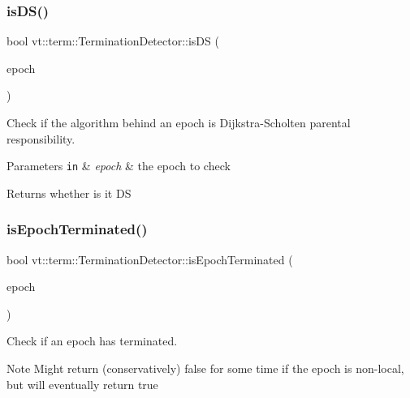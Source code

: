\subsubsection{\texorpdfstring{is\+D\+S()}{isDS()}}
{\footnotesize\ttfamily bool vt\+::term\+::\+Termination\+Detector\+::is\+DS (\begin{DoxyParamCaption}\item[{\hyperlink{namespacevt_a985a5adf291c34a3ca263b3378388236}{Epoch\+Type}}]{epoch }\end{DoxyParamCaption})\hspace{0.3cm}{\ttfamily [inline]}}



Check if the algorithm behind an epoch is Dijkstra-\/\+Scholten parental responsibility. 


\begin{DoxyParams}[1]{Parameters}
\mbox{\tt in}  & {\em epoch} & the epoch to check\\
\hline
\end{DoxyParams}
\begin{DoxyReturn}{Returns}
whether is it DS 
\end{DoxyReturn}
\mbox{\label{structvt_1_1term_1_1_termination_detector_a2c85d1d5316235e068433f4a3984a67e}} 
\subsubsection{\texorpdfstring{is\+Epoch\+Terminated()}{isEpochTerminated()}}
{\footnotesize\ttfamily bool vt\+::term\+::\+Termination\+Detector\+::is\+Epoch\+Terminated (\begin{DoxyParamCaption}\item[{\hyperlink{namespacevt_a985a5adf291c34a3ca263b3378388236}{Epoch\+Type}}]{epoch }\end{DoxyParamCaption})}



Check if an epoch has terminated. 

\begin{DoxyNote}{Note}
Might return (conservatively) false for some time if the epoch is non-\/local, but will eventually return true
\end{DoxyNote}

